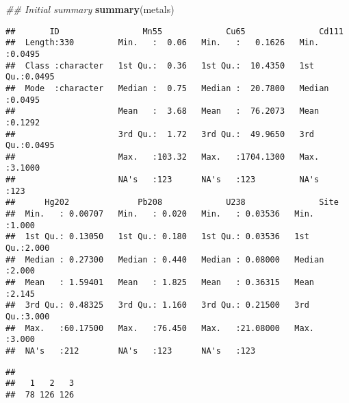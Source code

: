 \documentclass[]{article}
\newenvironment{Shaded}{\begin{snugshade}}{\end{snugshade}}
\newcommand{\CommentTok}[1]{\textcolor[rgb]{0.56,0.35,0.01}{\textit{#1}}}
\newcommand{\DecValTok}[1]{\textcolor[rgb]{0.00,0.00,0.81}{#1}}
\newcommand{\KeywordTok}[1]{\textcolor[rgb]{0.13,0.29,0.53}{\textbf{#1}}}
\newcommand{\NormalTok}[1]{#1}
\newcommand{\OperatorTok}[1]{\textcolor[rgb]{0.81,0.36,0.00}{\textbf{#1}}}
\begin{document}
\begin{Shaded}
\begin{Highlighting}[]
\CommentTok{## Initial summary}
\KeywordTok{summary}\NormalTok{(metals)}
\end{Highlighting}
\end{Shaded}

\begin{verbatim}
##       ID                 Mn55             Cu65               Cd111       
##  Length:330         Min.   :  0.06   Min.   :   0.1626   Min.   :0.0495  
##  Class :character   1st Qu.:  0.36   1st Qu.:  10.4350   1st Qu.:0.0495  
##  Mode  :character   Median :  0.75   Median :  20.7800   Median :0.0495  
##                     Mean   :  3.68   Mean   :  76.2073   Mean   :0.1292  
##                     3rd Qu.:  1.72   3rd Qu.:  49.9650   3rd Qu.:0.0495  
##                     Max.   :103.32   Max.   :1704.1300   Max.   :3.1000  
##                     NA's   :123      NA's   :123         NA's   :123     
##      Hg202              Pb208             U238               Site      
##  Min.   : 0.00707   Min.   : 0.020   Min.   : 0.03536   Min.   :1.000  
##  1st Qu.: 0.13050   1st Qu.: 0.180   1st Qu.: 0.03536   1st Qu.:2.000  
##  Median : 0.27300   Median : 0.440   Median : 0.08000   Median :2.000  
##  Mean   : 1.59401   Mean   : 1.825   Mean   : 0.36315   Mean   :2.145  
##  3rd Qu.: 0.48325   3rd Qu.: 1.160   3rd Qu.: 0.21500   3rd Qu.:3.000  
##  Max.   :60.17500   Max.   :76.450   Max.   :21.08000   Max.   :3.000  
##  NA's   :212        NA's   :123      NA's   :123
\end{verbatim}

\begin{Shaded}
\end{Shaded}

\begin{verbatim}
## 
##   1   2   3 
##  78 126 126
\end{verbatim}

\begin{Shaded}
\end{Shaded}
\end{document}
